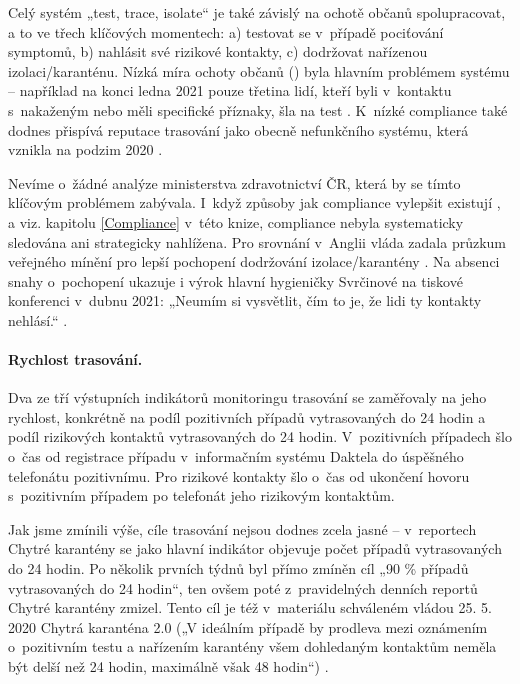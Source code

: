 Celý systém „test, trace, isolate“ je také závislý na ochotě občanů spolupracovat, a to ve třech klíčových momentech: a) testovat se v~případě pociťování symptomů, b) nahlásit své rizikové kontakty, c) dodržovat nařízenou izolaci/karanténu. Nízká míra ochoty občanů () byla hlavním problémem systému -- například na konci ledna 2021 pouze třetina lidí, kteří byli v~kontaktu s~nakaženým nebo měli specifické příznaky, šla na test \cite{tr_PAQ02}. K~nízké compliance také dodnes přispívá reputace trasování jako obecně nefunkčního systému, která vznikla na podzim 2020 \cite{tr_bisop01}.

Nevíme o~žádné analýze ministerstva zdravotnictví ČR, která by se tímto klí\-čo\-vým problémem zabývala. I~když způsoby jak compliance vylepšit existují \cite{tr_bisop02}, a viz. kapitolu \ref{Compliance} v~této knize, compliance nebyla systematicky sledována ani strategicky nahlížena. Pro srovnání v~Anglii vláda zadala průzkum veřejného mínění pro lepší pochopení dodržování izolace/karantény \cite{tr_ofns}. Na absenci snahy o~pochopení ukazuje i výrok hlavní hygieničky Svrčinové na tiskové konferenci v~dubnu 2021: „Neumím si vysvětlit, čím to je, že lidi ty kontakty nehlásí.“ \cite{tr_idnes01}.


\paragraph{Rychlost trasování.} Dva ze tří výstupních indikátorů monitoringu trasování se zaměřovaly na jeho rychlost, konkrétně na podíl pozitivních případů vytrasovaných do 24 hodin a podíl rizikových kontaktů vytrasovaných do 24 hodin. V~pozitivních případech šlo o~čas od registrace případu v~informačním systému Daktela do úspěšného telefonátu pozitivnímu. Pro rizikové kontakty šlo o~čas od ukončení hovoru s~pozitivním případem po telefonát jeho rizikovým kontaktům.

Jak jsme zmínili výše, cíle trasování nejsou dodnes zcela jasné -- v~reportech Chytré karantény se jako hlavní indikátor objevuje počet případů vytrasovaných do 24 hodin. Po několik prvních týdnů byl přímo zmíněn cíl „90 \% případů vytrasovaných do 24 hodin“, ten ovšem poté z~pravidelných denních reportů Chytré karantény zmizel. Tento cíl je též v~materiálu schváleném vládou 25. 5. 2020 Chytrá karanténa 2.0 („V ideálním případě by prodleva mezi oznámením o~pozitivním testu a nařízením karantény všem dohledaným kontaktům neměla být delší než 24 hodin, maximálně však 48 hodin“) \cite{tr_vlada01}.



